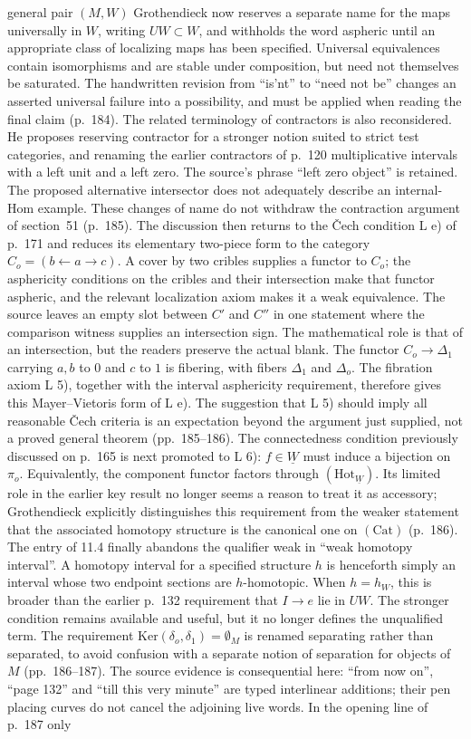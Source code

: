 general pair $(M,W)$ Grothendieck now reserves a separate name for the maps universally in $W$, writing $UW\subset W$, and withholds the word aspheric until an appropriate class of localizing maps has been specified. Universal equivalences contain isomorphisms and are stable under composition, but need not themselves be saturated. The handwritten revision from ``is'nt'' to ``need not be'' changes an asserted universal failure into a possibility, and must be applied when reading the final claim (p.~184). The related terminology of contractors is also reconsidered. He proposes reserving contractor for a stronger notion suited to strict test categories, and renaming the earlier contractors of p.~120 multiplicative intervals with a left unit and a left zero. The source's phrase ``left zero object'' is retained. The proposed alternative intersector does not adequately describe an internal-Hom example. These changes of name do not withdraw the contraction argument of section~51 (p.~185). The discussion then returns to the \v Cech condition L e) of p.~171 and reduces its elementary two-piece form to the category $C_o=(b\leftarrow a\to c)$. A cover by two cribles supplies a functor to $C_o$; the asphericity conditions on the cribles and their intersection make that functor aspheric, and the relevant localization axiom makes it a weak equivalence. The source leaves an empty slot between $C'$ and $C''$ in one statement where the comparison witness supplies an intersection sign. The mathematical role is that of an intersection, but the readers preserve the actual blank. The functor $C_o\to\Delta_1$ carrying $a,b$ to $0$ and $c$ to $1$ is fibering, with fibers $\Delta_1$ and $\Delta_o$. The fibration axiom L 5), together with the interval asphericity requirement, therefore gives this Mayer--Vietoris form of L e). The suggestion that L 5) should imply all reasonable \v Cech criteria is an expectation beyond the argument just supplied, not a proved general theorem (pp.~185--186). The connectedness condition previously discussed on p.~165 is next promoted to L 6): $f\in\underline W$ must induce a bijection on $\pi_o$. Equivalently, the component functor factors through $(\mathrm{Hot}_{\underline W})$. Its limited role in the earlier key result no longer seems a reason to treat it as accessory; Grothendieck explicitly distinguishes this requirement from the weaker statement that the associated homotopy structure is the canonical one on $(\mathrm{Cat})$ (p.~186). The entry of 11.4 finally abandons the qualifier weak in ``weak homotopy interval''. A homotopy interval for a specified structure $h$ is henceforth simply an interval whose two endpoint sections are $h$-homotopic. When $h=h_W$, this is broader than the earlier p.~132 requirement that $I\to e$ lie in $UW$. The stronger condition remains available and useful, but it no longer defines the unqualified term. The requirement $\mathrm{Ker}(\delta_o,\delta_1)=\emptyset_M$ is renamed separating rather than separated, to avoid confusion with a separate notion of separation for objects of $M$ (pp.~186--187). The source evidence is consequential here: ``from now on'', ``page 132'' and ``till this very minute'' are typed interlinear additions; their pen placing curves do not cancel the adjoining live words. In the opening line of p.~187 only 